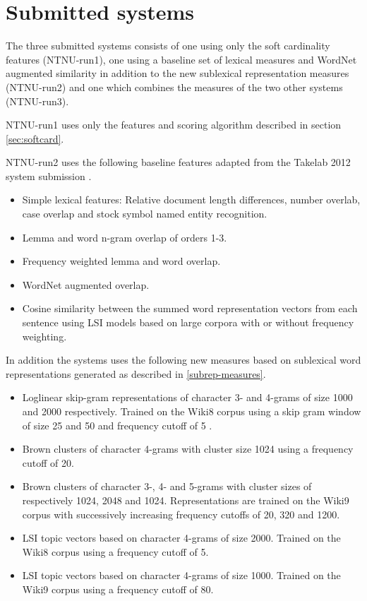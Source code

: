 
\section{Submitted systems}
\label{sec:systems}

The three submitted systems consists of one using only the soft cardinality features (NTNU-run1), one using a baseline set of lexical measures and WordNet augmented similarity in addition to the new sublexical representation measures (NTNU-run2) and one which combines the measures of the two other systems (NTNU-run3).

NTNU-run1 uses only the features and scoring algorithm described in section \ref{sec:softcard}.

NTNU-run2 uses the following baseline features adapted from the Takelab 2012 system submission \cite{saric2012takelab}.

\begin{itemize}
\item Simple lexical features: Relative document length differences, number overlab, case overlap and stock symbol named entity recognition.
\item Lemma and word n-gram overlap of orders 1-3.
\item Frequency weighted lemma and word overlap.
\item WordNet augmented overlap.
\item Cosine similarity between the summed word representation vectors from each sentence using LSI models based on large corpora with or without frequency weighting.
\end{itemize}

In addition the systems uses the following new measures based on sublexical word representations generated as described in \ref{subrep-measures}.

\begin{itemize}
\item Loglinear skip-gram representations of character 3- and 4-grams of size 1000 and 2000 respectively. Trained on the Wiki8 corpus using a skip gram window of size 25 and 50 and frequency cutoff of 5 .
\item Brown clusters of character 4-grams with cluster size 1024 using a frequency cutoff of 20.
\item Brown clusters of character 3-, 4- and 5-grams with cluster sizes of respectively 1024, 2048 and 1024. Representations are trained on the Wiki9 corpus with successively increasing frequency cutoffs of 20, 320 and 1200.
\item LSI topic vectors based on character 4-grams of size 2000.   Trained on the Wiki8 corpus using a frequency cutoff of 5.
\item LSI topic vectors based on character 4-grams of size 1000. Trained on the Wiki9 corpus using a frequency cutoff of 80.
\end{itemize}

